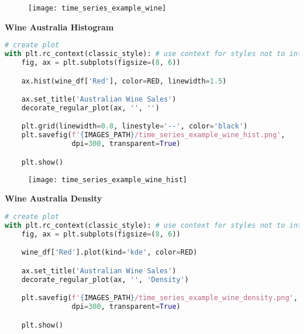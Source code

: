 \begin{figure}[h!]
  \centering
  \texttt{[image: time\_series\_example\_wine]}
\end{figure}\newpage


{\noindent\hspace{-12.5pt}\normalsize\bfseries Wine Australia Histogram}\vspace{-10pt}
\begin{center}
  \begin{lstlisting}[language=Python, 
  caption={Гистограмма месячного объёма продаж красного вина в Австралии.}, 
  label={lst:time_series_example_wine_hist}]
# create plot
with plt.rc_context(classic_style): # use context for styles not to interfere
    fig, ax = plt.subplots(figsize=(8, 6))

    ax.hist(wine_df['Red'], color=RED, linewidth=1.5)

    ax.set_title('Australian Wine Sales')
    decorate_regular_plot(ax, '', '')

    plt.grid(linewidth=0.8, linestyle='--', color='black')
    plt.savefig(f'{IMAGES_PATH}/time_series_example_wine_hist.png', 
                dpi=300, transparent=True)

    plt.show()
  \end{lstlisting}
\end{center}

\begin{figure}[h!]
  \centering
  \texttt{[image: time\_series\_example\_wine\_hist]}
\end{figure}\newpage


{\noindent\hspace{-12.5pt}\normalsize\bfseries Wine Australia Density}\vspace{-10pt}
\begin{center}
  \begin{lstlisting}[language=Python, 
  caption={График плотности месячного объёма продаж красного вина в Австралии.}, 
  label={lst:time_series_example_wine_density}]
# create plot
with plt.rc_context(classic_style): # use context for styles not to interfere
    fig, ax = plt.subplots(figsize=(8, 6))

    wine_df['Red'].plot(kind='kde', color=RED)

    ax.set_title('Australian Wine Sales')
    decorate_regular_plot(ax, '', 'Density')

    plt.savefig(f'{IMAGES_PATH}/time_series_example_wine_density.png', 
                dpi=300, transparent=True)

    plt.show()
  \end{lstlisting}
\end{center}

